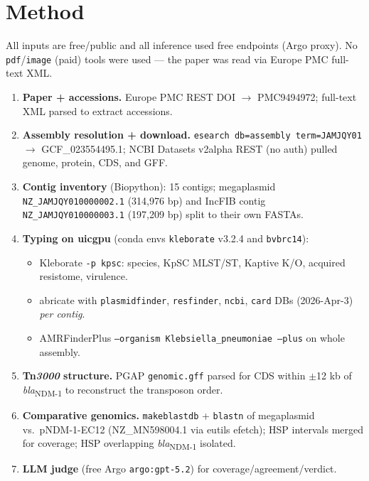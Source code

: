 \documentclass[11pt]{article}
\begin{document}
\section{Method}
All inputs are free/public and all inference used free endpoints (Argo
proxy). No \texttt{pdf}/\texttt{image} (paid) tools were used --- the paper
was read via Europe PMC full-text XML.
\begin{enumerate}[leftmargin=1.5em,itemsep=2pt]
  \item \textbf{Paper + accessions.} Europe PMC REST DOI $\rightarrow$
    PMC9494972; full-text XML parsed to extract accessions.
  \item \textbf{Assembly resolution + download.}
    \texttt{esearch db=assembly term=JAMJQY01} $\rightarrow$
    GCF\_023554495.1; NCBI Datasets v2alpha REST (no auth) pulled genome,
    protein, CDS, and GFF.
  \item \textbf{Contig inventory} (Biopython): 15 contigs; megaplasmid
    \texttt{NZ\_JAMJQY010000002.1} (314{,}976 bp) and IncFIB contig
    \texttt{NZ\_JAMJQY010000003.1} (197{,}209 bp) split to their own FASTAs.
  \item \textbf{Typing on uicgpu} (conda envs \texttt{kleborate} v3.2.4 and
    \texttt{bvbrc14}):
    \begin{itemize}[itemsep=1pt]
      \item Kleborate \texttt{-p kpsc}: species, KpSC MLST/ST, Kaptive K/O,
        acquired resistome, virulence.
      \item abricate with \texttt{plasmidfinder}, \texttt{resfinder},
        \texttt{ncbi}, \texttt{card} DBs (2026-Apr-3) \emph{per contig}.
      \item AMRFinderPlus
        \texttt{--organism Klebsiella\_pneumoniae --plus} on whole assembly.
    \end{itemize}
  \item \textbf{Tn\emph{3000} structure.} PGAP \texttt{genomic.gff} parsed for
    CDS within $\pm$12 kb of \emph{bla}\textsubscript{NDM-1} to reconstruct
    the transposon order.
  \item \textbf{Comparative genomics.} \texttt{makeblastdb} +
    \texttt{blastn} of megaplasmid vs.\ pNDM-1-EC12 (NZ\_MN598004.1 via
    eutils efetch); HSP intervals merged for coverage; HSP overlapping
    \emph{bla}\textsubscript{NDM-1} isolated.
  \item \textbf{LLM judge} (free Argo \texttt{argo:gpt-5.2}) for
    coverage/agreement/verdict.
\end{enumerate}
\end{document}
